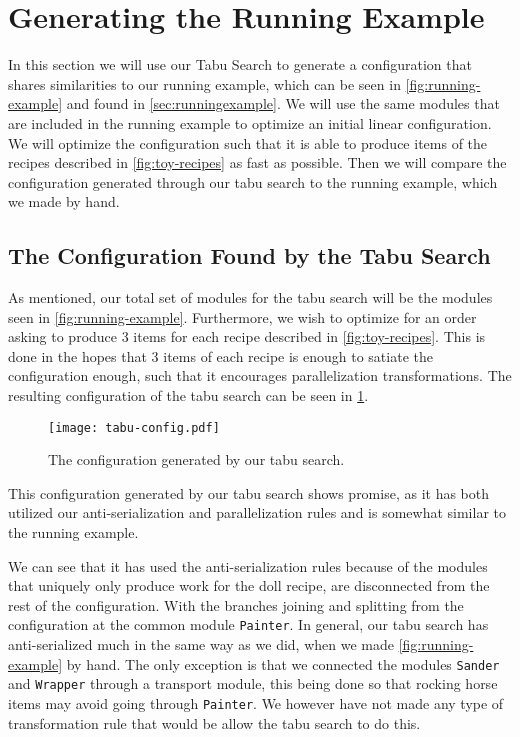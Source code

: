 \section{Generating the Running Example} \label{sec:exp-tabu}
In this section we will use our Tabu Search to generate a configuration that shares similarities to our running example, which can be seen in \cref{fig:running-example} and found in \cref{sec:runningexample}. We will use the same modules that are included in the running example to optimize an initial linear configuration. We will optimize the configuration such that it is able to produce items of the recipes described in \cref{fig:toy-recipes} as fast as possible. Then we will compare the configuration generated through our tabu search to the running example, which we made by hand.

\subsection{The Configuration Found by the Tabu Search}
As mentioned, our total set of modules for the tabu search will be the modules seen in \cref{fig:running-example}. Furthermore, we wish to optimize for an order asking to produce 3 items for each recipe described in \cref{fig:toy-recipes}. This is done in the hopes that 3 items of each recipe is enough to satiate the configuration enough, such that it encourages parallelization transformations. The resulting configuration of the tabu search can be seen in \cref{fig:tabu-config}.

\begin{figure}[H]
	\centering
	\texttt{[image: tabu-config.pdf]}
	\caption{The configuration generated by our tabu search.}
	\label{fig:tabu-config}
\end{figure}

This configuration generated by our tabu search shows promise, as it has both utilized our anti-serialization and parallelization rules and is somewhat similar to the running example. 

We can see that it has used the anti-serialization rules because of the modules that uniquely only produce work for the doll recipe, are disconnected from the rest of the configuration. With the branches joining and splitting from the configuration at the common module \texttt{Painter}. In general, our tabu search has anti-serialized much in the same way as we did, when we made \cref{fig:running-example} by hand. The only exception is that we connected the modules \texttt{Sander} and \texttt{Wrapper} through a transport module, this being done so that rocking horse items may avoid going through \texttt{Painter}. We however have not made any type of transformation rule that would be allow the tabu search to do this. 


